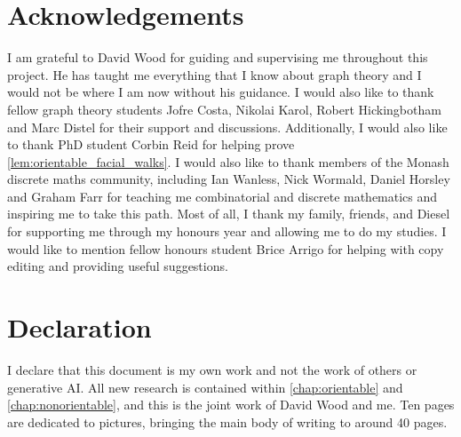 \section*{Acknowledgements}
I am grateful to David Wood for guiding and supervising me throughout this project. He has taught me everything that I know about graph theory and I would not be where I am now without his guidance. I would also like to thank fellow graph theory students Jofre Costa, Nikolai Karol, Robert Hickingbotham and Marc Distel for their support and discussions. Additionally, I would also like to thank PhD student Corbin Reid for helping prove \cref{lem:orientable_facial_walks}. I would also like to thank members of the Monash discrete maths community, including Ian Wanless, Nick Wormald, Daniel Horsley and Graham Farr for teaching me combinatorial and discrete mathematics and inspiring me to take this path. Most of all, I thank my family, friends, and Diesel for supporting me through my honours year and allowing me to do my studies. I would like to mention fellow honours student Brice Arrigo for helping with copy editing and providing useful suggestions.

\section*{Declaration}

I declare that this document is my own work and not the work of others or generative AI. All new research is contained within \cref{chap:orientable} and \cref{chap:nonorientable}, and this is the joint work of David Wood and me. Ten pages are dedicated to pictures, bringing the main body of writing to around 40 pages. 
